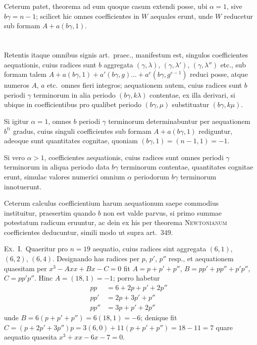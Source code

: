 \documentclass[12pt,a4paper]{article}
\theoremstyle{plain}
\theoremstyle{definition}
\theoremstyle{remark}
\begin{document}
Ceterum patet, theorema ad eum quoque casum extendi posse, ubi $\alpha=1$, sive $b\gamma=n-1$; scilicet hic omnes coefficientes in $W$ aequales erunt, unde $W$ reducetur sub formam $A+a(b\gamma,1)$.

\section{}

Retentis itaque omnibus signis art.\ praec., manifestum est, singulos coefficientes aequationis, cuius radices sunt $b$ aggregata $(\gamma,\lambda)$, $(\gamma,\lambda')$, $(\gamma,\lambda'')$ etc., sub formam talem $A+a(b\gamma,1)+a'(b\gamma,g)\ldots+a^e(b\gamma,g^{e-1})$ reduci posse, atque numeros $A$, $a$ etc.\ omnes fieri integros; aequationem autem, cuius radices sunt $b$ periodi $\gamma$ terminorum in alia periodo $(b\gamma,k\lambda)$ contentae, ex illa derivari, si ubique in coefficientibus pro qualibet periodo $(b\gamma,\mu)$ substituatur $(b\gamma,k\mu)$.

Si igitur $\alpha=1$, omnes $b$ periodi $\gamma$ terminorum determinabuntur per aequationem $b^{ti}$ gradus, cuius singuli coefficientes sub formam $A+a(b\gamma,1)$ rediguntur, adeoque sunt quantitates cognitae, quoniam $(b\gamma,1)=(n-1,1)=-1$.

Si vero $\alpha>1$, coefficientes aequationis, cuius radices sunt omnes periodi $\gamma$ terminorum in aliqua periodo data $b\gamma$ terminorum contentae, quantitates cognitae erunt, simulac valores numerici omnium $\alpha$ periodorum $b\gamma$ terminorum innotuerunt.

Ceterum calculus coefficientium harum aequationum saepe commodius instituitur, praesertim quando $b$ non est valde parvus, si primo summae potestatum radicum eruuntur, ac dein ex his per theorema \textsc{Newtonianum} coefficientes deducuntur, simili modo ut supra art.\ 349.

\textsc{Ex.\ I.}\ Quaeritur pro $n=19$ aequatio, cuius radices sint aggregata $(6,1)$, $(6,2)$, $(6,4)$. Designando has radices per $p$, $p'$, $p''$ resp., et aequationem quaesitam per $x^3-Axx+Bx-C=0$ fit $A=p+p'+p''$, $B=pp'+pp''+p'p''$, $C=pp'p''$. Hinc $A=(18,1)=-1$; porro habetur
\begin{align*}
pp&=6+2p+p'+2p''\\
pp'&=2p+3p'+p''\\
pp''&=3p+p'+2p''
\end{align*}
unde $B=6(p+p'+p'')=6(18,1)=-6$; denique fit $C=(p+2p'+3p'')p=3(6,0)+11(p+p'+p'')=18-11=7$ quare aequatio quaesita $x^3+xx-6x-7=0$.
\end{document}
